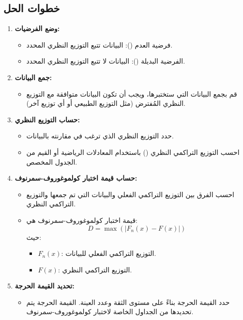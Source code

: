 \subsection*{خطوات الحل}

\begin{enumerate}
	\item \textbf{وضع الفرضيات:}
	\begin{itemize}
		\item فرضية العدم (): البيانات تتبع التوزيع النظري المحدد.
		\item الفرضية البديلة (): البيانات لا تتبع التوزيع النظري المحدد.
	\end{itemize}
	
	\item \textbf{جمع البيانات:}
	\begin{itemize}
		\item قم بجمع البيانات التي ستختبرها، ويجب أن تكون البيانات متوافقة مع التوزيع النظري المُفترض (مثل التوزيع الطبيعي أو أي توزيع آخر).
	\end{itemize}
	
	\item \textbf{حساب التوزيع النظري:}
	\begin{itemize}
		\item حدد التوزيع النظري الذي ترغب في مقارنته بالبيانات.
		\item احسب التوزيع التراكمي النظري () باستخدام المعادلات الرياضية أو القيم من الجدول المخصص.
	\end{itemize}
	
	\item \textbf{حساب قيمة اختبار كولموغوروف-سمرنوف:}
	\begin{itemize}
		\item احسب الفرق بين التوزيع التراكمي الفعلي والبيانات التي تم جمعها والتوزيع التراكمي النظري.
		\item قيمة اختبار كولموغوروف-سمرنوف هي:
		\[
		D = \max \left( |F_n(x) - F(x)| \right)
		\]
		حيث:
		\begin{itemize}
			\item \( F_n(x) \): التوزيع التراكمي الفعلي للبيانات.
			\item \( F(x) \): التوزيع التراكمي النظري.
		\end{itemize}
	\end{itemize}
	
	\item \textbf{تحديد القيمة الحرجة:}
	\begin{itemize}
		\item حدد القيمة الحرجة بناءً على مستوى الثقة وعدد العينة. القيمة الحرجة يتم تحديدها من الجداول الخاصة لاختبار كولموغوروف-سمرنوف.
	\end{itemize}
	

\end{enumerate}

